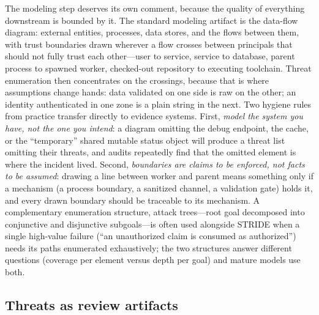 The modeling step deserves its own comment, because the quality of
everything downstream is bounded by it. The standard modeling
artifact is the data-flow diagram: external entities, processes,
data stores, and the flows between them, with trust boundaries drawn
wherever a flow crosses between principals that should not fully
trust each other---user to service, service to database, parent
process to spawned worker, checked-out repository to executing
toolchain. Threat enumeration then concentrates on the crossings,
because that is where assumptions change hands: data validated on
one side is raw on the other; an identity authenticated in one zone
is a plain string in the next. Two hygiene rules from practice
\cite{shostack} transfer directly to evidence systems. First,
\emph{model the system you have, not the one you intend}: a diagram
omitting the debug endpoint, the cache, or the ``temporary'' shared
mutable status object will produce a threat list omitting their
threats, and audits repeatedly find that the omitted element is
where the incident lived. Second, \emph{boundaries are claims to be
enforced, not facts to be assumed}: drawing a line between worker
and parent means something only if a mechanism (a process boundary,
a sanitized channel, a validation gate) holds it, and every drawn
boundary should be traceable to its mechanism. A complementary
enumeration structure, attack trees---root goal decomposed into
conjunctive and disjunctive subgoals---is often used alongside
STRIDE when a single high-value failure (``an unauthorized claim is
consumed as authorized'') needs its paths enumerated exhaustively;
the two structures answer different questions (coverage per element
versus depth per goal) and mature models use both.

\subsection{Threats as review artifacts}\label{ch02:threat-artifacts}

